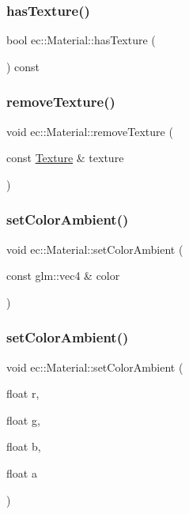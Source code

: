 \subsubsection{\texorpdfstring{has\+Texture()}{hasTexture()}}
{\footnotesize\ttfamily bool ec\+::\+Material\+::has\+Texture (\begin{DoxyParamCaption}{ }\end{DoxyParamCaption}) const}

\mbox{\label{classec_1_1_material_a83a673bcbcdef42bcea99939e5d6ff03}} 
\subsubsection{\texorpdfstring{remove\+Texture()}{removeTexture()}}
{\footnotesize\ttfamily void ec\+::\+Material\+::remove\+Texture (\begin{DoxyParamCaption}\item[{const \mbox{\hyperlink{classec_1_1_texture}{Texture}} \&}]{texture }\end{DoxyParamCaption})}

\mbox{\label{classec_1_1_material_afdd82441b5b2168161a17824e4a90f6f}} 
\subsubsection{\texorpdfstring{set\+Color\+Ambient()}{setColorAmbient()}\hspace{0.1cm}{\footnotesize\ttfamily [1/2]}}
{\footnotesize\ttfamily void ec\+::\+Material\+::set\+Color\+Ambient (\begin{DoxyParamCaption}\item[{const glm\+::vec4 \&}]{color }\end{DoxyParamCaption})}

\mbox{\label{classec_1_1_material_a4ee41422a7625ac8a9f8a5e52bb18cf7}} 
\subsubsection{\texorpdfstring{set\+Color\+Ambient()}{setColorAmbient()}\hspace{0.1cm}{\footnotesize\ttfamily [2/2]}}
{\footnotesize\ttfamily void ec\+::\+Material\+::set\+Color\+Ambient (\begin{DoxyParamCaption}\item[{float}]{r,  }\item[{float}]{g,  }\item[{float}]{b,  }\item[{float}]{a }\end{DoxyParamCaption})}


